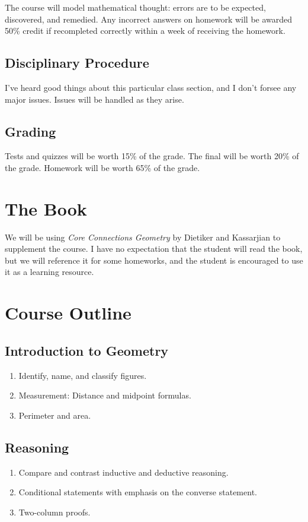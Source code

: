 \documentclass[11pt,article,oneside]{memoir}
\begin{document}
The course will model mathematical thought: errors are to be expected, discovered, and remedied. Any incorrect answers
on homework will be awarded 50\% credit if recompleted correctly within a week of receiving the homework.
\subsection*{Disciplinary Procedure}
	I've heard good things about this particular class section, and I don't forsee any major issues. Issues will be handled as they arise.
\subsection*{Grading}
	Tests and quizzes will be worth 15\% of the grade. The final will be worth 20\% of the grade. Homework will be worth 65\% of the grade.




\section*{The Book}
We will be using \textit{Core Connections Geometry} by Dietiker and Kassarjian to supplement the course. I have no expectation
that the student will read the book, but we will reference it for some homeworks, and the student is 
encouraged to use it as a learning resource.



\section*{Course Outline}
\subsection*{Introduction to Geometry}
\begin{enumerate}
\item Identify, name, and classify figures.
\item Measurement: Distance and midpoint formulas.
\item Perimeter and area.
\end{enumerate}
\subsection*{Reasoning}
\begin{enumerate}
\item Compare and contrast inductive and deductive reasoning.
\item Conditional statements with emphasis on the converse statement.
\item Two-column proofs.
\end{enumerate}
\end{document}
